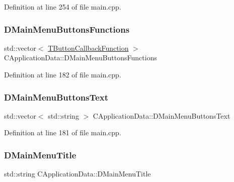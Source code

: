 Definition at line 254 of file main.\+cpp.

\hypertarget{classCApplicationData_a9f9c3de6840e902711636257640a8e91}{}\label{classCApplicationData_a9f9c3de6840e902711636257640a8e91} 
\subsubsection{\texorpdfstring{D\+Main\+Menu\+Buttons\+Functions}{DMainMenuButtonsFunctions}}
{\footnotesize\ttfamily std\+::vector$<$ \hyperlink{main_8cpp_af91bc223ea3fea871af009bfef33c595}{T\+Button\+Callback\+Function} $>$ C\+Application\+Data\+::\+D\+Main\+Menu\+Buttons\+Functions\hspace{0.3cm}{\ttfamily [protected]}}



Definition at line 182 of file main.\+cpp.

\hypertarget{classCApplicationData_a1e1c9f4434847c50210c0b36ff475f78}{}\label{classCApplicationData_a1e1c9f4434847c50210c0b36ff475f78} 
\subsubsection{\texorpdfstring{D\+Main\+Menu\+Buttons\+Text}{DMainMenuButtonsText}}
{\footnotesize\ttfamily std\+::vector$<$ std\+::string $>$ C\+Application\+Data\+::\+D\+Main\+Menu\+Buttons\+Text\hspace{0.3cm}{\ttfamily [protected]}}



Definition at line 181 of file main.\+cpp.

\hypertarget{classCApplicationData_a2b0ca036562d2af6eca3ee4a6e2330f8}{}\label{classCApplicationData_a2b0ca036562d2af6eca3ee4a6e2330f8} 
\subsubsection{\texorpdfstring{D\+Main\+Menu\+Title}{DMainMenuTitle}}
{\footnotesize\ttfamily std\+::string C\+Application\+Data\+::\+D\+Main\+Menu\+Title\hspace{0.3cm}{\ttfamily [protected]}}



